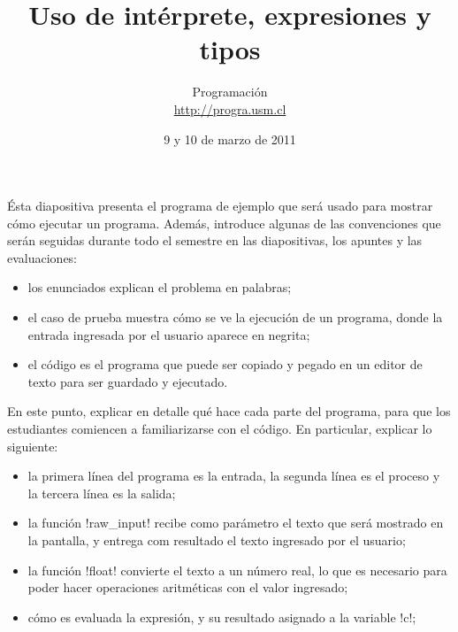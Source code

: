 \documentclass[10pt]{article}
\title{Uso de intérprete, expresiones y tipos}
\author{Programación \\ \url{http://progra.usm.cl}}
\date{9 y 10 de marzo de 2011}
\begin{document}
  \maketitle


  Ésta diapositiva presenta el programa de ejemplo
  que será usado para mostrar cómo ejecutar un programa.
  Además, introduce algunas de las convenciones
  que serán seguidas durante todo el semestre
  en las diapositivas, los apuntes y las evaluaciones:
  \begin{itemize}
    \item los enunciados explican el problema en palabras;
    \item el caso de prueba muestra cómo se ve la ejecución de un programa,
      donde la entrada ingresada por el usuario aparece en negrita;
    \item el código es el programa que puede ser copiado y pegado
      en un editor de texto para ser guardado y ejecutado.
  \end{itemize}

  En este punto,
  explicar en detalle qué hace cada parte del programa,
  para que los estudiantes comiencen a familiarizarse con el código.
  En particular, explicar lo siguiente:
  \begin{itemize}
    \item la primera línea del programa es la entrada,
      la segunda línea es el proceso
      y la tercera línea es la salida;
    \item la función \li!raw_input! recibe como parámetro
      el texto que será mostrado en la pantalla,
      y entrega com resultado el texto ingresado por el usuario;
    \item la función \li!float! convierte el texto a un número real,
      lo que es necesario para poder hacer operaciones aritméticas
      con el valor ingresado;
    \item cómo es evaluada la expresión,
      y su resultado asignado a la variable \li!c!;
  \end{itemize}
\end{document}
